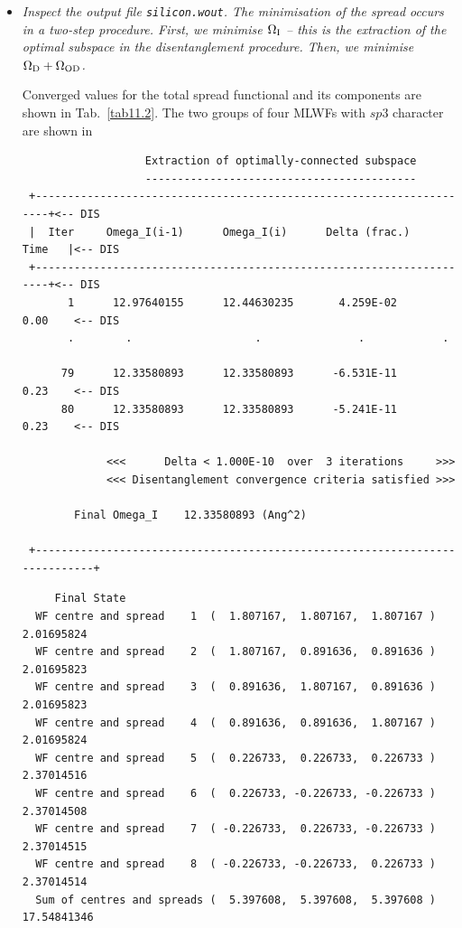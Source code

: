 \begin{itemize}
	\item {\it Inspect the output file {\tt silicon.wout}. The minimisation of the spread occurs in a two-step procedure. First, we minimise $\Omega\tinysub{I}$ -- this is the extraction of the optimal subspace in the disentanglement procedure. Then, we minimise $\Omega\tinysub{D} + \Omega\tinysub{OD}$.}

	Converged values for the total spread functional and its components are shown in Tab.~\ref{tab11.2}.
	The two groups of four MLWFs with $sp3$ character are shown in 

	\begin{tcolorbox}[sharp corners,boxrule=0.5pt]
	{\small
	\begin{verbatim}
                   Extraction of optimally-connected subspace
                   ------------------------------------------
 +---------------------------------------------------------------------+<-- DIS
 |  Iter     Omega_I(i-1)      Omega_I(i)      Delta (frac.)    Time   |<-- DIS
 +---------------------------------------------------------------------+<-- DIS
       1      12.97640155      12.44630235       4.259E-02      0.00    <-- DIS
       .		.					.				.			 .

      79      12.33580893      12.33580893      -6.531E-11      0.23    <-- DIS
      80      12.33580893      12.33580893      -5.241E-11      0.23    <-- DIS

             <<<      Delta < 1.000E-10  over  3 iterations     >>>
             <<< Disentanglement convergence criteria satisfied >>>

        Final Omega_I    12.33580893 (Ang^2)

 +----------------------------------------------------------------------------+
	\end{verbatim}
	}
	\end{tcolorbox}

	\begin{tcolorbox}[sharp corners,boxrule=0.5pt]
	{\small
	\begin{verbatim}
	 Final State
  WF centre and spread    1  (  1.807167,  1.807167,  1.807167 )     2.01695824
  WF centre and spread    2  (  1.807167,  0.891636,  0.891636 )     2.01695823
  WF centre and spread    3  (  0.891636,  1.807167,  0.891636 )     2.01695823
  WF centre and spread    4  (  0.891636,  0.891636,  1.807167 )     2.01695824
  WF centre and spread    5  (  0.226733,  0.226733,  0.226733 )     2.37014516
  WF centre and spread    6  (  0.226733, -0.226733, -0.226733 )     2.37014508
  WF centre and spread    7  ( -0.226733,  0.226733, -0.226733 )     2.37014515
  WF centre and spread    8  ( -0.226733, -0.226733,  0.226733 )     2.37014514
  Sum of centres and spreads (  5.397608,  5.397608,  5.397608 )    17.54841346


\end{verbatim}}
\end{tcolorbox}
\end{itemize}
